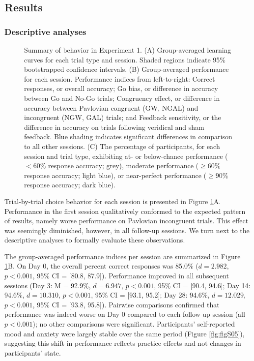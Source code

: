 \documentclass[a4paper,12pt]{article}
\begin{document}
\begin{refsection}[main]
\subsection*{Results}

\subsubsection*{Descriptive analyses}

\begin{figure}[hpt]
    \centerline{}
    \caption{Summary of behavior in Experiment 1. (A) Group-averaged learning curves for each trial type and session. Shaded regions indicate 95\% bootstrapped confidence intervals. (B) Group-averaged performance for each session. Performance indices from left-to-right: Correct responses, or overall accuracy; Go bias, or difference in accuracy between Go and No-Go trials; Congruency effect, or difference in accuracy between Pavlovian congruent (GW, NGAL) and incongruent (NGW, GAL) trials; and Feedback sensitivity, or the difference in accuracy on trials following veridical and sham feedback. Blue shading indicates significant differences in comparison to all other sessions. (C) The percentage of participants, for each session and trial type, exhibiting at- or below-chance performance ($< 60\%$ response accuracy; grey), moderate performance ($\geq 60\%$ response accuracy; light blue), or near-perfect performance ($\geq 90\%$ response accuracy; dark blue).}
    \label{fig:exp01_behavior}
\end{figure}

Trial-by-trial choice behavior for each session is presented in Figure \ref{fig:exp01_behavior}A. Performance in the first session qualitatively conformed to the expected pattern of results, namely worse performance on Pavlovian incongruent trials. This effect was seemingly diminished, however, in all follow-up sessions. We turn next to the descriptive analyses to formally evaluate these observations. 

The group-averaged performance indices per session are summarized in Figure \ref{fig:exp01_behavior}B. On Day 0, the overall percent correct responses was 85.0\% ($d = 2.982$, $p < 0.001$, 95\% CI = [80.8, 87.9]). Performance improved in all subsequent sessions (Day 3: M = 92.9\%, $d = 6.947$, $p < 0.001$, 95\% CI = [90.4, 94.6]; Day 14: 94.6\%, $d = 10.310$, $p < 0.001$, 95\% CI = [93.1, 95.2]; Day 28: 94.6\%, $d=12.029$, $p < 0.001$, 95\% CI = [93.8, 95.8]). Pairwise comparisons confirmed that performance was indeed worse on Day 0 compared to each follow-up session (all $p < 0.001$); no other comparisons were significant. Participants' self-reported mood and anxiety were largely stable over the same period (Figure \ref{fig:figS05}), suggesting this shift in performance reflects practice effects and not changes in participants' state. 


\end{refsection}
\end{document}
